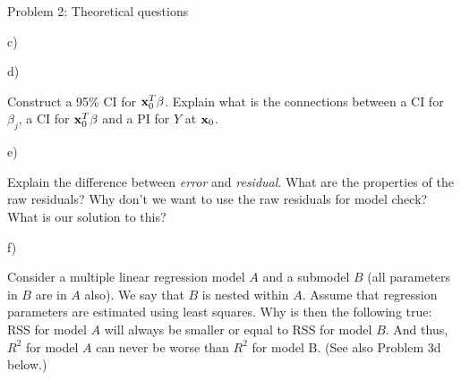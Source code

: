 \documentclass[ignorenonframetext,]{beamer}
\begin{document}
\begin{frame}
\begin{block}{Problem 2: Theoretical questions}
\begin{block}{c)}
\end{block}

\begin{block}{d)}

Construct a 95\% CI for \({\bf x}_0^T \beta\). Explain what is the
connections between a CI for \(\beta_j\), a CI for \({\bf x}_0^T \beta\)
and a PI for \(Y\) at \({\bf x}_0\).

\end{block}

\begin{block}{e)}

Explain the difference between \emph{error} and \emph{residual}. What
are the properties of the raw residuals? Why don't we want to use the
raw residuals for model check? What is our solution to this?

\end{block}

\begin{block}{f)}

Consider a multiple linear regression model \(A\) and a submodel \(B\)
(all parameters in \(B\) are in \(A\) also). We say that \(B\) is nested
within \(A\). Assume that regression parameters are estimated using
least squares. Why is then the following true: RSS for model \(A\) will
always be smaller or equal to RSS for model \(B\). And thus, \(R^2\) for
model \(A\) can never be worse than \(R^2\) for model B. (See also
Problem 3d below.)

\end{block}

\end{block}

\end{frame}
\end{document}
